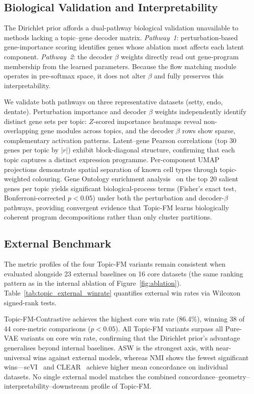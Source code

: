 \documentclass[biology,article,submit,pdftex,moreauthors]{Definitions/mdpi}
\begin{document}
\subsection{Biological Validation and Interpretability}

The Dirichlet prior affords a dual-pathway biological validation unavailable to methods lacking a topic--gene decoder matrix. \emph{Pathway~1}: perturbation-based gene-importance scoring identifies genes whose ablation most affects each latent component. \emph{Pathway~2}: the decoder $\beta$ weights directly read out gene-program membership from the learned parameters. Because the flow matching module operates in pre-softmax space, it does not alter $\beta$ and fully preserves this interpretability.

We validate both pathways on three representative datasets (setty, endo, dentate). Perturbation importance and decoder $\beta$ weights independently identify distinct gene sets per topic: $Z$-scored importance heatmaps reveal non-overlapping gene modules across topics, and the decoder $\beta$ rows show sparse, complementary activation patterns. Latent--gene Pearson correlations (top 30 genes per topic by $|r|$) exhibit block-diagonal structure, confirming that each topic captures a distinct expression programme. Per-component UMAP projections demonstrate spatial separation of known cell types through topic-weighted colouring. Gene Ontology enrichment analysis~\cite{ashburner2000gene} on the top 20 salient genes per topic yields significant biological-process terms (Fisher's exact test, Bonferroni-corrected $p < 0.05$) under both the perturbation and decoder-$\beta$ pathways, providing convergent evidence that Topic-FM learns biologically coherent program decompositions rather than only cluster partitions.

\subsection{External Benchmark}
The metric profiles of the four Topic-FM variants remain consistent when evaluated alongside 23 external baselines on 16 core datasets (the same ranking pattern as in the internal ablation of Figure~\ref{fig:ablation}). Table~\ref{tab:topic_external_winrate} quantifies external win rates via Wilcoxon signed-rank tests.



Topic-FM-Contrastive achieves the highest core win rate (86.4\%), winning 38 of 44 core-metric comparisons ($p < 0.05$). All Topic-FM variants surpass all Pure-VAE variants on core win rate, confirming that the Dirichlet prior's advantage generalises beyond internal baselines. ASW is the strongest axis, with near-universal wins against external models, whereas NMI shows the fewest significant wins---scVI~\cite{lopez2018deep} and CLEAR~\cite{han2022clear} achieve higher mean concordance on individual datasets. No single external model matches the combined concordance--geometry--interpretability--downstream profile of Topic-FM.
\end{document}
